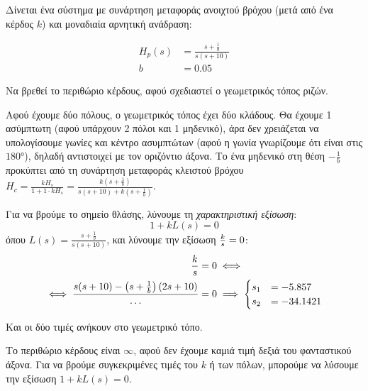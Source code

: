 \documentclass[11pt,a4paper,notitlepage,fleqn]{article}
\begin{document}
\begin{exercise}
Δίνεται ένα σύστημα με συνάρτηση μεταφοράς ανοιχτού βρόχου (μετά από ένα κέρδος \( k \)) και
μοναδιαία αρνητική ανάδραση:

\begin{align*}
	H_p(s) &= \frac{s+\frac{1}{b}}{s(s+10)}\\
	b &= 0.05
\end{align*}

Να βρεθεί το περιθώριο κέρδους, αφού σχεδιαστεί ο γεωμετρικός τόπος ριζών.

\tcblower

Αφού έχουμε δύο πόλους, ο γεωμετρικός τόπος έχει δύο κλάδους. Θα έχουμε 1 ασύμπτωτη (αφού
υπάρχουν 2 πόλοι και 1 μηδενικό), άρα δεν χρειάζεται να υπολογίσουμε γωνίες και κέντρο
ασυμπτώτων (αφού η γωνία γνωρίζουμε ότι είναι στις \( \ang{180} \)), δηλαδή αντιστοιχεί
με τον οριζόντιο άξονα. Το ένα μηδενικό στη θέση \( -\frac{1}{b} \) προκύπτει από
τη συνάρτηση μεταφοράς κλειστού βρόχου \( H_c = \frac{kH_s}{1+1\cdot kH_s} = \frac{k\left(s+\frac{1}{b}\right)}{s(s+10)+k\left(s+\frac{1}{b}\right)} \).

Για να βρούμε το σημείο θλάσης, λύνουμε τη \textit{χαρακτηριστική εξίσωση}:
\[
1 + kL(s) = 0
\]
όπου \( L(s) = \displaystyle \frac{s+\frac{1}{b}}{s(s+10)} \), και λύνουμε την
εξίσωση \( \frac{k}{s} = 0 \):
\begin{align*}
	\frac{k}{s} &= 0 \iff \\
	\iff \frac{s(s+10)-\left(s+\frac{1}{b}\right)(2s+10)}{\dots} &= 0
	\implies \begin{cases}
	s_1 &= -5.857 \\
	s_2 &= -34.1421
	\end{cases}
\end{align*}

Και οι δύο τιμές ανήκουν στο γεωμετρικό τόπο.


Το περιθώριο κέρδους είναι \( \infty \), αφού δεν έχουμε καμιά τιμή δεξιά του φανταστικού άξονα. Για να βρούμε συγκεκριμένες τιμές του \( k \) ή των πόλων, μπορούμε να λύσουμε την
εξίσωση \( 1+kL(s) = 0 \).

\end{exercise}
\end{document}
